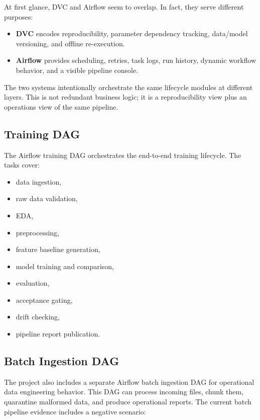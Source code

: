 \documentclass[11pt,a4paper]{article}
\begin{document}
At first glance, DVC and Airflow seem to overlap. In fact, they serve different purposes:

\begin{itemize}[leftmargin=1.4em]
  \item \textbf{DVC} encodes reproducibility, parameter dependency tracking, data/model versioning, and offline re-execution.
  \item \textbf{Airflow} provides scheduling, retries, task logs, run history, dynamic workflow behavior, and a visible pipeline console.
\end{itemize}

The two systems intentionally orchestrate the same lifecycle modules at different layers. This is not redundant business logic; it is a reproducibility view plus an operations view of the same pipeline.

\subsection{Training DAG}

The Airflow training DAG orchestrates the end-to-end training lifecycle. The tasks cover:

\begin{itemize}[leftmargin=1.4em]
  \item data ingestion,
  \item raw data validation,
  \item EDA,
  \item preprocessing,
  \item feature baseline generation,
  \item model training and comparison,
  \item evaluation,
  \item acceptance gating,
  \item drift checking,
  \item pipeline report publication.
\end{itemize}

\subsection{Batch Ingestion DAG}

The project also includes a separate Airflow batch ingestion DAG for operational data engineering behavior. This DAG can process incoming files, chunk them, quarantine malformed data, and produce operational reports. The current batch pipeline evidence includes a negative scenario:
\end{document}
